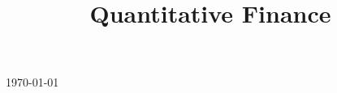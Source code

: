 

\title{Quantitative Finance}

\usepackage[sort=standard]{glossaries} 
\makeglossaries



\maketitle
\centerline{\today}
\tableofcontents







